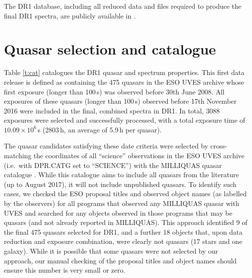 \documentclass[fleqn,usenatbib,usedcolumn]{mnras}
\newcommand{\Tref}[1]{Table \ref{#1}}
\begin{document}
The DR1 database, including all reduced data and files required to produce the final DR1 spectra, are publicly available in \citet{Murphy:2018:UVESSQUADDR1}.


\section{Quasar selection and catalogue}\label{s:selection}

\Tref{t:cat} catalogues the DR1 quasar and spectrum properties. This first data release is defined as containing the 475 quasars in the ESO UVES archive whose first exposure (longer than 100\,s) was observed before 30th June 2008. All exposures of these quasars (longer than 100\,s) observed before 17th November 2016 were included in the final, combined spectra in DR1. In total, 3088 exposures were selected and successfully processed, with a total exposure time of $10.09\times10^6$\,s (2803\,h, an average of 5.9\,h per quasar).

The quasar candidates satisfying these date criteria were selected by cross-matching the coordinates of all ``science'' observations in the ESO UVES archive (i.e.\ with DPR.CATG set to ``SCIENCE'') with the MILLIQUAS quasar catalogue \citep[][updated to version 5.2\footnote{See {\url{http://quasars.org/milliquas.htm}}}]{Flesch:2015:e010}. While this catalogue aims to include all quasars from the literature (up to August 2017), it will not include unpublished quasars. To identify such cases, we checked the ESO proposal titles and observed object names (as labelled by the observers) for all programs that observed any MILLIQUAS quasar with UVES and searched for any objects observed in those programs that may be quasars (and not already reported in MILLIQUAS). This approach identified 9 of the final 475 quasars selected for DR1, and a further 18 objects that, upon data reduction and exposure combination, were clearly not quasars (17 stars and one galaxy). While it is possible that some quasars were not selected by our approach, our manual checking of the proposal titles and object names should ensure this number is very small or zero.
\end{document}
